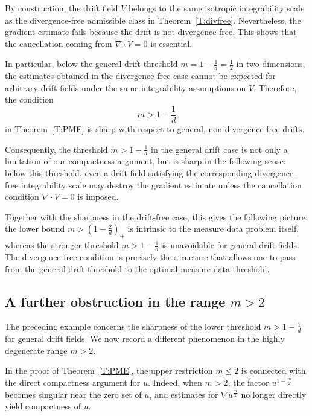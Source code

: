 \documentclass{amsart}
\numberwithin{equation}{section}
\begin{document}
By construction, the drift field \(V\) belongs to the same isotropic integrability scale as the divergence-free admissible class in Theorem~\ref{T:divfree}. Nevertheless, the gradient estimate fails because the drift is not divergence-free. This shows that the cancellation coming from \(\nabla\cdot V=0\) is
essential. 

In particular, below the general-drift threshold
\(
m=1-\frac{1}{d}=\frac{1}{2}
\)
in two dimensions, the estimates obtained in the divergence-free case
cannot be expected for arbitrary drift fields under the same integrability
assumptions on \(V\). Therefore, the condition
\[
m>1-\frac{1}{d}
\]
in Theorem~\ref{T:PME} is sharp with respect to general, non-divergence-free
drifts.

Consequently, the threshold \(m>1-\frac{1}{d}\) in the general drift case is
not only a limitation of our compactness argument, but is sharp in the
following sense: below this threshold, even a drift field satisfying the
corresponding divergence-free integrability scale may destroy the gradient
estimate unless the cancellation condition \(\nabla\cdot V=0\) is imposed.







Together with the sharpness in the drift-free case, this gives the following picture: the lower bound
\(
m>\left(1-\frac{2}{d}\right)_+
\)
is intrinsic to the measure data problem itself, whereas the stronger threshold \(m>1-\frac{1}{d}\) is unavoidable for general drift fields. The divergence-free condition is precisely the structure that allows one to pass from the general-drift threshold to the optimal measure-data threshold.



\subsection{A further obstruction in the range \(m>2\)}
\label{S:obstruction-m-greater-than-two}



The preceding example concerns the sharpness of the lower threshold
\(m>1-\frac{1}{d}\) for general drift fields. We now record a different
phenomenon in the highly degenerate range \(m>2\).

In the proof of Theorem~\ref{T:PME}, the upper restriction \(m\le2\) is
connected with the direct compactness argument for \(u\). Indeed, when
\(m>2\), the factor
\(
u^{1-\frac{m}{2}}
\)
becomes singular near the zero set of \(u\), and estimates for
\(\nabla u^{\frac{m}{2}}\) no longer directly yield compactness of \(u\).
\end{document}
